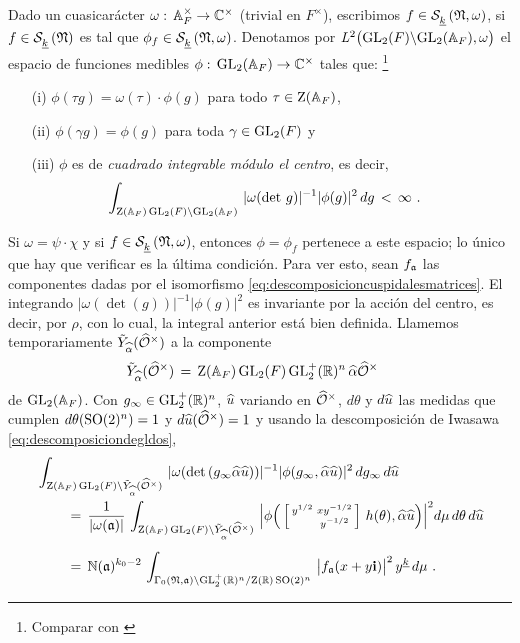 Dado un cuasicar\'{a}cter $\omega:\,\ideles{F}\rightarrow\bb{C}^{\times}$
(trivial en $F^{\times}$), escribimos $f\in\spitzH{k}{\frak{N},\omega}$, si
$f\in\spitzH{k}{\frak{N}}$ es tal que $\phi_{f}\in\spitzH{k}{\frak{N},\omega}$.
Denotamos por $\cuadradointegrables{\omega}$ el espacio de funciones medibles
$\phi:\,\GL_{2}(\adeles{F})\rightarrow\bb{C}^{\times}$ tales que:%
\footnote{Comparar con \cite[Ch.~3]{Bump}}
\begin{itemize}
	\item[(i)] $\phi(\tau g)=\omega(\tau)\cdot\phi(g)$ para todo
		$\tau\in\centre(\adeles{F})$,
	\item[(ii)] $\phi(\gamma g)=\phi(g)$ para toda $\gamma\in\GL_{2}(F)$ y
	\item[(iii)] $\phi$ es de \emph{cuadrado integrable m\'{o}dulo el %
		centro}, es decir,
		\begin{align*}
			\int_{\centre(\adeles{F})\,\GL_{2}(F)\backslash%
				\GL_{2}(\adeles{F})}\,|\omega(\det\,g)|^{-1}
				|\phi(g)|^{2}\,dg & \,<\,\infty
			\text{ .}
		\end{align*}
\end{itemize}
%
Si $\omega=\psi\cdot\chi$ y si $f\in\spitzH{k}{\frak{N},\omega}$, entonces
$\phi=\phi_{f}$ pertenece a este espacio; lo \'{u}nico que hay que verificar es
la \'{u}ltima condici\'{o}n. Para ver esto, sean $f_{\frak{a}}$ las componentes
dadas por el isomorfismo \eqref{eq:descomposicioncuspidalesmatrices}. El
integrando $|\omega(\det(g))|^{-1}|\phi(g)|^{2}$ es invariante por la
acci\'{o}n del centro, es decir, por $\rho$, con lo cual, la integral anterior
est\'{a} bien definida. Llamemos temporariamente
$\tilde{Y}_{\hhat{\alpha}}(\Idfin{\cal{O}})$ a la componente
\begin{align*}
	\tilde{Y}_{\hhat{\alpha}}(\Idfin{\cal{O}}) & \,=\,
		\centre(\adeles{F})\,\GL_{2}(F)\,\GLtp_{2}(\bb{R})^{n}\,
			\hhat{\alpha}\Idfin{\cal{O}}
\end{align*}
%
de $\GL_{2}(\adeles{F})$. Con $g_{\infty}\in\GLtp_{2}(\bb{R})^{n}$, $\hhat{u}$
variando en $\Idfin{\cal{O}}$, $d\theta$ y $d\hhat{u}$ las medidas que cumplen
$d\theta(\SO{2}^{n})=1$ y $d\hhat{u}(\Idfin{\cal{O}})=1$ y usando la
descomposici\'{o}n de Iwasawa \eqref{eq:descomposiciondegldos},
\begin{align*}
	& \int_{\centre(\adeles{F})\,\GL_{2}(F)\backslash%
		\tilde{Y}_{\hhat{\alpha}}(\Idfin{\cal{O}})}\,
		|\omega(\det(g_{\infty}\hhat{\alpha}\hhat{u}))|^{-1}
		|\phi(g_{\infty},\hhat{\alpha}\hhat{u})|^{2}\,
		dg_{\infty}\,d\hhat{u} \\
	& \qquad\,=\, \frac{1}{|\omega(\frak{a})|}\,
		\int_{\centre(\adeles{F})\,\GL_{2}(F)\backslash%
		\tilde{Y}_{\hhat{\alpha}}(\Idfin{\cal{O}})}\,
			\Big|\phi\Big(
			\left[\begin{smallmatrix}
				y^{1/2} & xy^{-1/2} \\
				& y^{-1/2}
			\end{smallmatrix}\right]\,h(\theta),
			\hhat{\alpha}\hhat{u}
			\Big)\Big|^{2}
		d\mu\,d\theta\,d\hhat{u} \\[5pt]
	& \qquad\,=\,\idnorm(\frak{a})^{k_{0}-2}\,
		\int_{\Gamma_{0}(\frak{N},\frak{a})\backslash%
		\GLtp_{2}(\bb{R})^{n}/\centre(\bb{R})\,\SO{2}^{n}}\,
		\big|f_{\frak{a}}(x+y\mathbf{i})\big|^{2}\,y^{\peso{k}}\,d\mu
	\text{ .}
\end{align*}
